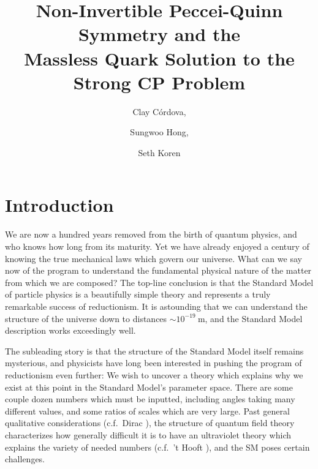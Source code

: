 \documentclass[11pt,a4paper]{article}
\begin{document}
  \title{Non-Invertible Peccei-Quinn Symmetry and the \\ Massless Quark Solution to the Strong CP Problem}  



\author[a,b]{Clay C\'{o}rdova,}
\author[c]{Sungwoo Hong,}
\author[a,d]{Seth Koren}



\maketitle

\section{Introduction} \label{sec:background}

We are now a hundred years removed from the birth of quantum physics, and who knows how long from its maturity. Yet we have already enjoyed a century of knowing the true mechanical laws which govern our universe. What can we say now of the program to understand the fundamental physical nature of the matter from which we are composed? 
The top-line conclusion is that the Standard Model of particle physics is a beautifully simple theory and represents a truly remarkable success of reductionism. It is astounding that we can understand the structure of the universe down to distances $\sim 10^{-19} \ \text{m}$, and the Standard Model description works exceedingly well.

The subleading story is that the structure of the Standard Model itself remains mysterious, and physicists have long been interested in pushing the program of reductionism even further: We wish to uncover a theory which explains why we exist at this point in the Standard Model's parameter space. There are some couple dozen numbers which must be inputted, including angles taking many different values, and some ratios of scales which are very large. Past general qualitative considerations (c.f.\ Dirac \cite{Dirac:1938mt}), the structure of quantum field theory characterizes how generally difficult it is to have an ultraviolet theory which explains the variety of needed numbers (c.f.\ 't Hooft \cite{tHooft:1979rat}), and the SM poses certain challenges. 
\end{document}
